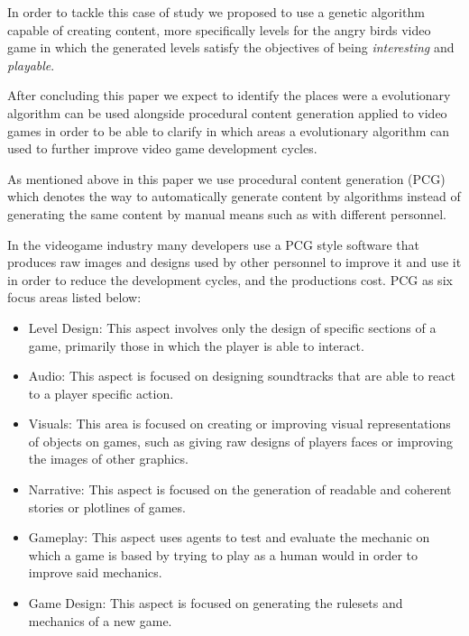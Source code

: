 \documentclass[conference]{IEEEtran}
\begin{document}
In order to tackle this case of study we proposed to use a genetic algorithm capable 
of creating content, more specifically levels for the angry birds video game in which
the generated levels satisfy the objectives of being \textit{interesting} and 
\textit{playable}.

After concluding this paper we expect to identify the places were a evolutionary 
algorithm can be used alongside procedural content generation applied to video games
in order to be able to clarify in which areas a evolutionary algorithm can used 
to further improve video game development cycles.

As mentioned above in this paper we use procedural content generation (PCG) 
which denotes the way to automatically generate
content by algorithms instead of generating the same content by manual means
such as with different personnel.

In the videogame industry many developers use a PCG style software that produces
raw images and designs used by other personnel to improve it and use it in order
to reduce the development cycles, and the productions cost. PCG as six focus
areas listed below:

\begin{itemize}
    \item Level Design: This aspect involves only the design of specific
    sections of a game, primarily those in which the player is able to interact.
    \item Audio: This aspect is focused on designing soundtracks that are able
    to react to a player specific action.
    \item Visuals: This area is focused on creating or improving visual
    representations of objects on games, such as giving raw designs of players
    faces or improving the images of other graphics.
    \item Narrative: This aspect is focused on the generation of readable and
    coherent stories or plotlines of games.
    \item Gameplay: This aspect uses agents to test and evaluate the mechanic on
    which a game is based by trying to play as a human would in order to improve
    said mechanics.
    \item Game Design: This aspect is focused on generating the rulesets and 
    mechanics of a new game. \cite{Yannakakis2017,Smith2014,shaker2016procedural}
\end{itemize}
\end{document}
